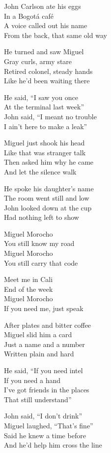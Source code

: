 \begin{lyrics}
John Carlson ate his eggs\\
In a Bogotá café\\
A voice called out his name\\
From the back, that same old way

He turned and saw Miguel\\
Gray curls, army stare\\
Retired colonel, steady hands\\
Like he’d been waiting there

He said, “I saw you once\\
At the terminal last week”\\
John said, “I meant no trouble\\
I ain’t here to make a leak”

Miguel just shook his head\\
Like that was stranger talk\\
Then asked him why he came\\
And let the silence walk

He spoke his daughter’s name\\
The room went still and low\\
John looked down at the cup\\
Had nothing left to show

Miguel Morocho\\
You still know my road\\
Miguel Morocho\\
You still carry that code

Meet me in Cali\\
End of the week\\
Miguel Morocho\\
If you need me, just speak

After plates and bitter coffee\\
Miguel slid him a card\\
Just a name and a number\\
Written plain and hard

He said, “If you need intel\\
If you need a hand\\
I’ve got friends in the places\\
That still understand”

John said, “I don’t drink”\\
Miguel laughed, “That’s fine”\\
Said he knew a time before\\
And he’d help him cross the line


\end{lyrics}
